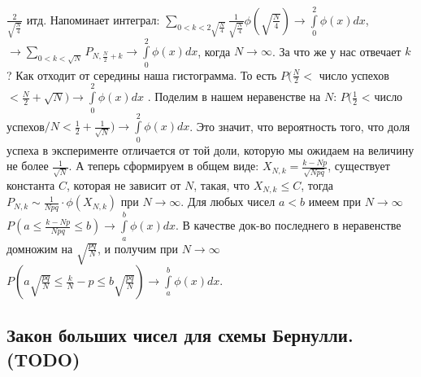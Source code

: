 $\frac{2}{\sqrt{\frac{N}{4}}}$ итд. Напоминает интеграл: $\sum\limits_{0 < k < 2\sqrt{\frac{N}{4}}} \frac{1}{\sqrt{\frac{N}{4}}} \phi(\sqrt{\frac{N}{4}}) \to \int\limits_{0}^{2} \phi(x) dx$, $\xrightarrow{} \sum\limits_{0 < k < \sqrt{N}} P_{N, \frac{N}{2} + k} \to \int\limits_{0}^{2} \phi(x) dx$, когда $N \to \infty$. За что же у нас отвечает $k$? Как отходит от середины наша гистограмма. То есть $P(\frac{N}{2} < $ число успехов $< \frac{N}{2} + \sqrt{N}) \to \int\limits_{0}^{2} \phi(x) dx$ . Поделим в нашем неравенстве на $N$: $P(\frac{1}{2}$ < число успехов$/N < \frac{1}{2} + \frac{1}{\sqrt{N}}) \to \int\limits_{0}^{2} \phi(x) dx$. Это значит, что вероятность того, что доля успеха в эксперименте отличается от той доли, которую мы ожидаем на величину не более $\frac{1}{\sqrt{N}}$. А теперь сформируем в общем виде: $X_{N,k} = \frac{k - Np}{\sqrt{Npq}}$, существует константа $C$, которая не зависит от $N$, такая, что $X_{N,k} \leq C$, тогда $P_{N,k} \sim \frac{1}{Npq} \cdot \phi(X_{N,k})$ при $N \to \infty$. Для любых чисел $a < b$ имеем при $N \to \infty$ $P(a \leq \frac{k - Np}{Npq} \leq b) \to \int\limits_{a}^{b} \phi(x) dx$. В качестве док-во последнего в неравенстве домножим на $\sqrt{\frac{pq}{N}}$, и получим при $N \to \infty$ $P(a\sqrt{\frac{pq}{N}} \leq \frac{k}{N} - p \leq b\sqrt{\frac{pq}{N}}) \to \int\limits_{a}^{b} \phi(x) dx$.

\subsection{Закон больших чисел для схемы Бернулли.  (TODO)}